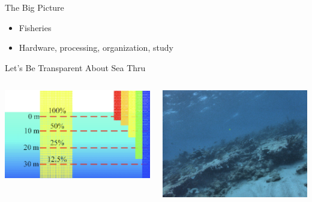 \begin{frame}{The Big Picture}
    \begin{itemize}
        \item Fisheries
        \item Hardware, processing, organization, study
    \end{itemize}    
\end{frame}

\begin{frame}{Let's Be Transparent About Sea Thru}
    \begin{columns}
        \begin{column}{0.5\textwidth}
            \includegraphics[height=1.0\textheight,width=1.0\textwidth,keepaspectratio]{images/light.png}
        \end{column}
        \begin{column}{0.5\textwidth}
            \includegraphics[height=1.0\textheight,width=1.0\textwidth,keepaspectratio]{images/grainy.png}
        \end{column}
    \end{columns}
\end{frame}